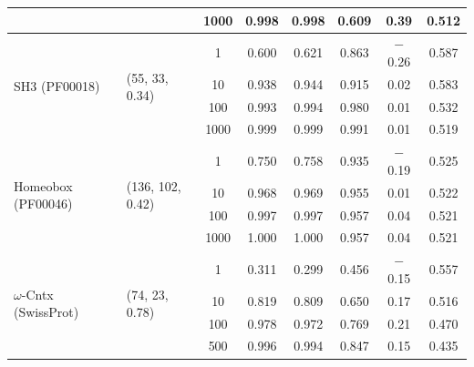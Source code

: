 \documentclass{article}
\theoremstyle{definition}
\theoremstyle{remark}
\begin{document}
\begin{table}[p]
\begin{tabular}{llcccccc}
    & & 1000 & 0.998 & 0.998 & 0.609 & 0.39 & 0.512 \\
    \midrule
    \multirow{4}{*}{SH3 (PF00018)}
      & \multirow{4}{*}{(55, 33, 0.34)}
      &    1 & 0.600 & 0.621 & 0.863 & $-$0.26 & 0.587 \\
    & &   10 & 0.938 & 0.944 & 0.915 & 0.02 & 0.583 \\
    & &  100 & 0.993 & 0.994 & 0.980 & 0.01 & 0.532 \\
    & & 1000 & 0.999 & 0.999 & 0.991 & 0.01 & 0.519 \\
    \midrule
    \multirow{4}{*}{Homeobox (PF00046)}
      & \multirow{4}{*}{(136, 102, 0.42)}
      &    1 & 0.750 & 0.758 & 0.935 & $-$0.19 & 0.525 \\
    & &   10 & 0.968 & 0.969 & 0.955 & 0.01 & 0.522 \\
    & &  100 & 0.997 & 0.997 & 0.957 & 0.04 & 0.521 \\
    & & 1000 & 1.000 & 1.000 & 0.957 & 0.04 & 0.521 \\
    \midrule
    \multirow{4}{*}{$\omega$-Cntx (SwissProt)}
      & \multirow{4}{*}{(74, 23, 0.78)}
      &    1 & 0.311 & 0.299 & 0.456 & $-$0.15 & 0.557 \\
    & &   10 & 0.819 & 0.809 & 0.650 & 0.17 & 0.516 \\
    & &  100 & 0.978 & 0.972 & 0.769 & 0.21 & 0.470 \\
    & &  500 & 0.996 & 0.994 & 0.847 & 0.15 & 0.435 \\
    \bottomrule
  \end{tabular}
\end{table}
\end{document}
